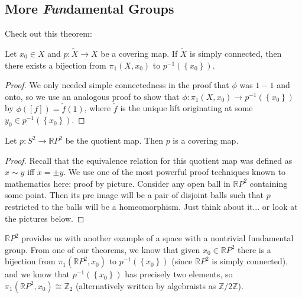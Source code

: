 \subsection{More \textit{Fun}damental Groups}
 Check out this theorem:
\begin{theorem}
Let $x_0\in X$ and $p\colon \tilde{X}\to X$ be a covering map. If $\tilde{X}$ is simply connected, then there exists a bijection from $\pi_1(X,x_0)$ to $p^{-1}(\left\{x_0\right\})$.
\end{theorem}
\begin{proof}
We only needed simple connectedness in the proof that $\phi$ was $1-1$ and onto, so we use an analogous proof to show that $\phi \colon \pi_1(X,x_0)\to p^{-1}(\left\{x_0\right\})$ by $\phi([f])=\tilde{f}(1)$, where $\tilde{f}$ is the unique lift originating at some $y_0\in p^{-1}(\left\{x_0\right\})$. 
\end{proof}

\begin{theorem}
Let $p\colon S^2\to \mathbb{R}P^2$ be the quotient map. Then $p$ is a covering map.
\end{theorem}
\begin{proof}
Recall that the equivalence relation for this quotient map was defined as $x\sim y$ iff $x=\pm y$. We use one of the most powerful proof techniques known to mathematics here: proof by picture. Consider any open ball in $\mathbb{R}P^2$ containing some point. Then its pre image will be a pair of disjoint balls such that $p$ restricted to the balls will be a homeomorphism. Just think about it... or look at the pictures below.
\placeholder
\end{proof}

$\mathbb{R}P^2$ provides us with another example of a space with a nontrivial fundamental group. From one of our theorems, we know that given $x_0\in \mathbb{R}P^2$ there is a bijection from $\pi_1(\mathbb{R}P^2,x_0)$ to $p^{-1}(\left\{x_0\right\})$ (since $\mathbb{R}P^2$ is simply connected), and we know that $p^{-1}(\left\{x_0\right\})$ has precisely two elements, so $\pi_1(\mathbb{R}P^2,x_0)\cong \mathbb{Z}_2$ (alternatively written by algebraists as $\mathbb{Z}/ 2\mathbb{Z}$).


